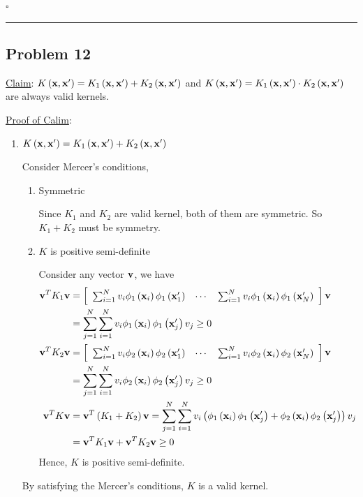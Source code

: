 \documentclass[12pt]{article}
\newcommand*{\QEDB}{\hfill\ensuremath{\square}}
\newcommand{\SBrackets}[1]{\left[#1\right]}
\newcommand{\ParTh}[1]{\left(#1\right)}
\newcommand{\BF}[1]{{\bf#1}}
\newcommand{\Matrix}[2]{\SBrackets{\begin{array}{#1}#2\end{array}}}
\newcommand{\horrule}[1]{\rule{\linewidth}{#1}}
\begin{document}
\QEDB

\horrule{0.5pt}

\subsection*{Problem 12}

\underline{Claim}: $K\ParTh{\BF{x},\BF{x}^\prime}=K_1\ParTh{\BF{x},\BF{x}^\prime}+K_2\ParTh{\BF{x},\BF{x}^\prime}$ and $K\ParTh{\BF{x},\BF{x}^\prime}=K_1\ParTh{\BF{x},\BF{x}^\prime}\cdot K_2\ParTh{\BF{x},\BF{x}^\prime}$ are always valid kernels.

\underline{Proof of Calim}:

\begin{enumerate}
	\item $K\ParTh{\BF{x},\BF{x}^\prime}=K_1\ParTh{\BF{x},\BF{x}^\prime}+K_2\ParTh{\BF{x},\BF{x}^\prime}$
	
	Consider Mercer's conditions,
	\begin{enumerate}
		\item Symmetric
		
		Since $K_1$ and $K_2$ are valid kernel, both of them are symmetric. So $K_1+K_2$ must be symmetry.
		\item $K$ is positive semi-definite
		
		Consider any vector $\BF{v}$, we have
		\begin{align}
		\BF{v}^TK_1\BF{v}&=\Matrix{ccc}{\sum_{i=1}^{N}v_i\phi_1\ParTh{\BF{x}_i}\phi_1\ParTh{\BF{x}^\prime_1}&\cdots&\sum_{i=1}^{N}v_i\phi_1\ParTh{\BF{x}_i}\phi_1\ParTh{\BF{x}^\prime_N}}\BF{v}\\
		&=\sum_{j=1}^{N}\sum_{i=1}^{N}v_i\phi_1\ParTh{\BF{x}_i}\phi_1\ParTh{\BF{x}^\prime_j}v_j\geq0\\
		\BF{v}^TK_2\BF{v}&=\Matrix{ccc}{\sum_{i=1}^{N}v_i\phi_2\ParTh{\BF{x}_i}\phi_2\ParTh{\BF{x}^\prime_1}&\cdots&\sum_{i=1}^{N}v_i\phi_2\ParTh{\BF{x}_i}\phi_2\ParTh{\BF{x}^\prime_N}}\BF{v}\\
		&=\sum_{j=1}^{N}\sum_{i=1}^{N}v_i\phi_2\ParTh{\BF{x}_i}\phi_2\ParTh{\BF{x}^\prime_j}v_j\geq0\\
		\BF{v}^TK\BF{v}&=\BF{v}^T\ParTh{K_1+K_2}\BF{v}=\sum_{j=1}^{N}\sum_{i=1}^{N}v_i\ParTh{\phi_1\ParTh{\BF{x}_i}\phi_1\ParTh{\BF{x}^\prime_j}+\phi_2\ParTh{\BF{x}_i}\phi_2\ParTh{\BF{x}^\prime_j}}v_j\\
		&=\BF{v}^TK_1\BF{v}+\BF{v}^TK_2\BF{v}\geq0
		\end{align}
		Hence, $K$ is positive semi-definite.
	\end{enumerate}
	By satisfying the Mercer's conditions, $K$ is a valid kernel.
	

\end{enumerate}
\end{document}
